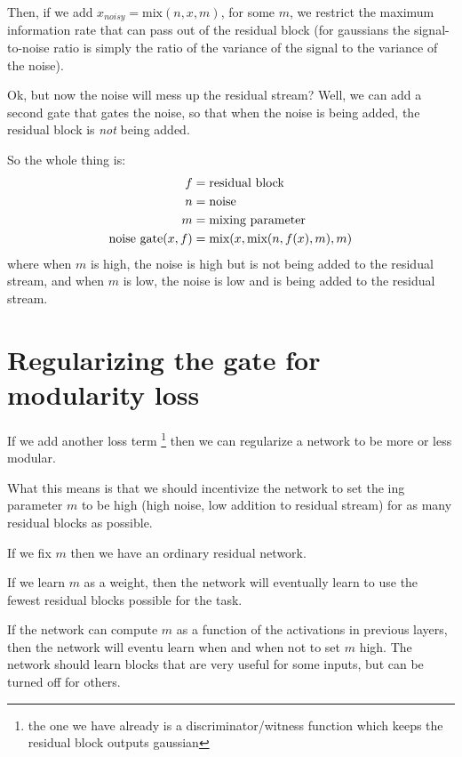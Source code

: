 \documentclass{article}
\begin{document}
Then, if we add $x_{noisy} = \text{mix}(n, x, m)$, for some $m$, we restrict the maximum information rate that can pass out of the residual block (for gaussians the signal-to-noise ratio is simply the ratio of the variance of the signal to the variance of the noise).

Ok, but now the noise will mess up the residual stream? Well, we can add a second gate that gates the noise, so that when the noise is being added, the residual block is \textit{not} being added.

So the whole thing is:
\begin{align*}
    f &= \text{residual block} \\
    n &= \text{noise} \\
    m &= \text{mixing parameter} \\
    \text{noise gate}(x, f) &= \text{mix}(x, \text{\text{mix}}(n, f(x), m), m)
\end{align*}
where when $m$ is high, the noise is high but is not being added to the residual stream, and when $m$ is low, the noise is low and is being added to the residual stream.

\section{Regularizing the gate for modularity loss}

If we add another loss term \footnote{the one we have already is a discriminator/witness function which keeps the residual block outputs gaussian} then we can regularize a network to be more or less modular.

What this means is that we should incentivize the network to set the ing parameter $m$ to be high (high noise, low addition to residual stream) for as many residual blocks as possible.

If we fix $m$ then we have an ordinary residual network.

If we learn $m$ as a weight, then the network will eventually learn to use the fewest residual blocks possible for the task.

If the network can compute $m$ as a function of the activations in previous layers, then the network will eventu learn when and when not to set $m$ high. The network should learn blocks that are very useful for some inputs, but can be turned off for others.

\printbibliography
\end{document}

